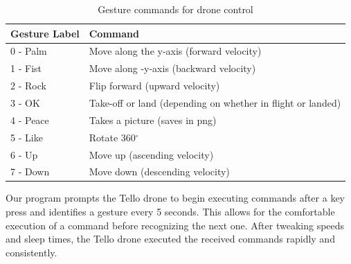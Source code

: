 \begin{table}[ht]
	\centering
	\begin{tabular}{ll}
		\toprule
		Gesture Label & Command \\
		\midrule
		0 - Palm& Move along the y-axis (forward velocity) \\
		1 - Fist& Move along -y-axis (backward velocity) \\
		2 - Rock& Flip forward (upward velocity) \\
		3 - OK & Take-off or land (depending on whether in flight or landed) \\
		4 - Peace& Takes a picture (saves in png) \\
		5 - Like& Rotate 360$^\circ$ \\
		6 - Up& Move up (ascending velocity) \\
		7 - Down & Move down (descending velocity)\\
		\bottomrule
	\end{tabular}
	\caption{Gesture commands for drone control}
	\label{tab:gesture_commands}
\end{table}

Our program prompts the Tello drone to begin executing commands after a key press and identifies a gesture every 5 seconds. This allows for the comfortable execution of a command before recognizing the next one. After tweaking speeds and sleep times, the Tello drone executed the received commands rapidly and consistently.

